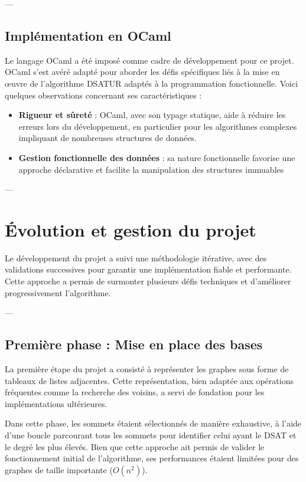 \documentclass[11pt]{article}
\begin{document}
---

\subsection{Implémentation en OCaml}

Le langage OCaml a été imposé comme cadre de développement pour ce projet. OCaml s'est avéré adapté pour aborder les défis spécifiques liés à la mise en œuvre de l'algorithme DSATUR adaptés à la programmation fonctionnelle. Voici quelques observations concernant ses caractéristiques :

\begin{itemize}
    \item \textbf{Rigueur et sûreté} : OCaml, avec son typage statique, aide à réduire les erreurs lors du développement, en particulier pour les algorithmes complexes impliquant de nombreuses structures de données.
    \item \textbf{Gestion fonctionnelle des données} : sa nature fonctionnelle favorise une approche déclarative et facilite la manipulation des structures immuables
\end{itemize}

---

\section{Évolution et gestion du projet}

Le développement du projet a suivi une méthodologie itérative, avec des validations successives pour garantir une implémentation fiable et performante. Cette approche a permis de surmonter plusieurs défis techniques et d'améliorer progressivement l'algorithme.

---

\subsection{Première phase : Mise en place des bases}

La première étape du projet a consisté à représenter les graphes sous forme de tableaux de listes adjacentes. Cette représentation, bien adaptée aux opérations fréquentes comme la recherche des voisins, a servi de fondation pour les implémentations ultérieures.

Dans cette phase, les sommets étaient sélectionnés de manière exhaustive, à l'aide d'une boucle parcourant tous les sommets pour identifier celui ayant le DSAT et le degré les plus élevés. Bien que cette approche ait permis de valider le fonctionnement initial de l'algorithme, ses performances étaient limitées pour des graphes de taille importante (\( O(n^2) \)).
\end{document}
